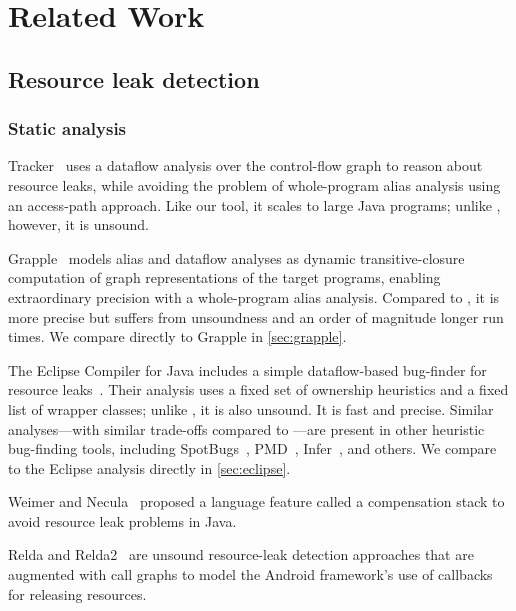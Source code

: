 \section{Related Work}
\label{sec:relatedwork}

\subsection{Resource leak detection}
\label{sec:rw-resource-leaks}



\subsubsection{Static analysis}

Tracker~\cite{TorlakC10} uses a dataflow analysis over the control-flow
graph to reason about resource leaks, while avoiding the problem of
whole-program alias analysis using an access-path approach. Like our tool,
it scales to large Java programs; unlike \Tool, however, it is unsound.

Grapple~\cite{zuo2019grapple} models alias and dataflow analyses as
dynamic transitive-closure computation of graph representations of
the target programs, enabling extraordinary precision with a whole-program
alias analysis. Compared to \Tool, it is more precise but suffers
from unsoundness and an order of magnitude longer run times.
We compare directly to Grapple in \cref{sec:grapple}.

The Eclipse Compiler for Java includes a simple dataflow-based
bug-finder for resource leaks~\cite{ecj-resource-leak}. Their analysis
uses a fixed set of ownership heuristics and a fixed list of wrapper
classes; unlike \Tool, it is also unsound. It is fast and
 precise.  Similar analyses---with similar trade-offs
compared to \Tool---are present in other heuristic bug-finding tools,
including SpotBugs~\cite{spotbugs-resource-leak},
PMD~\cite{pmd-resource-leak}, Infer~\cite{infer-resource-leak}, and others.
We compare to the Eclipse analysis directly in \cref{sec:eclipse}.

Weimer and Necula~\cite{WeimerN04} proposed a language feature called
a compensation stack to avoid resource leak problems in Java.

Relda and Relda2~\cite{guo2013characterizing,wu2016relda2} are unsound
resource-leak detection approaches that are augmented with call graphs
to model the Android framework's use of callbacks for releasing
resources.

